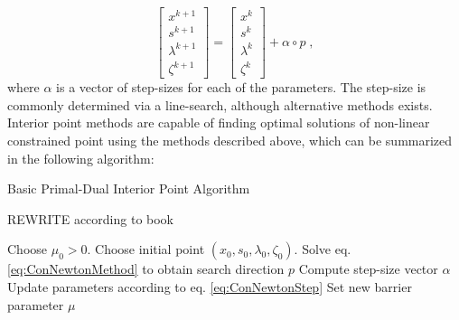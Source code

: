 \begin{equation}
\begin{bmatrix}
  x^{k+1} \\ s^{k+1} \\ \lambda^{k+1} \\ \zeta^{k+1} 
\end{bmatrix} 
=
\begin{bmatrix}
  x^{k} \\ s^{k} \\ \lambda^{k} \\ \zeta^{k} 
\end{bmatrix} 
+ \alpha \circ p \; ,
\label{eq:ConNewtonStep}
\end{equation}
where $\alpha$ is a vector of step-sizes for each of the parameters. The step-size is commonly determined via a line-search, although alternative methods exists.\\
Interior point methods are capable of finding optimal solutions of non-linear constrained point using the methods described above, which can be summarized in the following algorithm:
\begin{algorithm}
\begin{algorithmic}
\caption{Basic Primal-Dual Interior Point Algorithm}
\State REWRITE according to book

\State Choose $\mu_0 > 0$.
\State Choose initial point $(x_0 , s_0 ,  \lambda_0 , \zeta_0)$.
	\State Solve eq. \eqref{eq:ConNewtonMethod} to obtain search direction $p$
	\State Compute step-size vector $\alpha$
	\State Update parameters according to eq. \eqref{eq:ConNewtonStep}	
	\State Set new barrier parameter $\mu$
\EndWhile
\end{algorithmic}
\end{algorithm}

